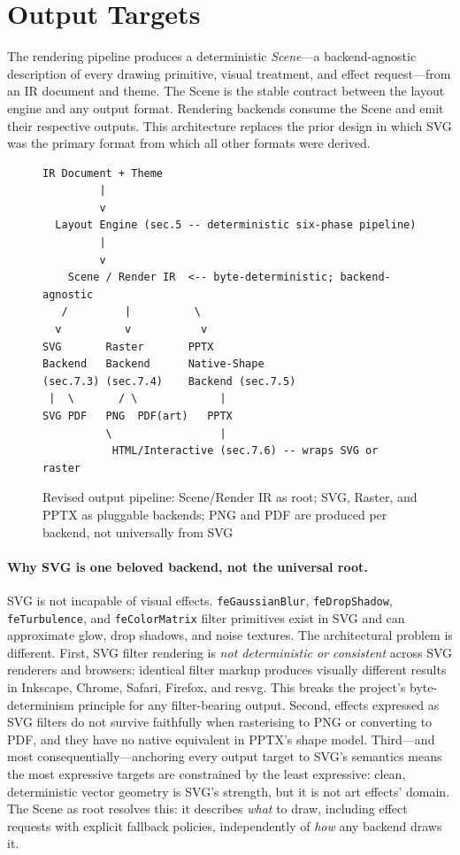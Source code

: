\section{Output Targets}
\label{sec:outputs}

The rendering pipeline produces a deterministic \emph{Scene}---a backend-agnostic
description of every drawing primitive, visual treatment, and effect request---from an IR
document and theme. The Scene is the stable contract between the layout engine and any
output format. Rendering backends consume the Scene and emit their respective outputs.
This architecture replaces the prior design in which SVG was the primary format from
which all other formats were derived.

\begin{figure}[h]
\centering
\begin{Verbatim}[frame=single,fontsize=\small]
  IR Document + Theme
         |
         v
  Layout Engine (sec.5 -- deterministic six-phase pipeline)
         |
         v
    Scene / Render IR  <-- byte-deterministic; backend-agnostic
   /         |          \
  v          v           v
SVG       Raster       PPTX
Backend   Backend      Native-Shape
(sec.7.3) (sec.7.4)    Backend (sec.7.5)
 |  \       / \             |
SVG PDF   PNG  PDF(art)   PPTX
          \                 |
           HTML/Interactive (sec.7.6) -- wraps SVG or raster
\end{Verbatim}
\caption{Revised output pipeline: Scene/Render IR as root; SVG, Raster, and PPTX as
  pluggable backends; PNG and PDF are produced per backend, not universally from SVG}
\label{fig:output-pipeline}
\end{figure}

\paragraph{Why SVG is one beloved backend, not the universal root.}
SVG is not incapable of visual effects. \texttt{feGaussianBlur}, \texttt{feDropShadow},
\texttt{feTurbulence}, and \texttt{feColorMatrix} filter primitives exist in SVG and can
approximate glow, drop shadows, and noise textures. The architectural problem is different.
First, SVG filter rendering is \emph{not deterministic or consistent} across SVG renderers
and browsers: identical filter markup produces visually different results in Inkscape,
Chrome, Safari, Firefox, and resvg. This breaks the project's byte-determinism principle
for any filter-bearing output. Second, effects expressed as SVG filters do not survive
faithfully when rasterising to PNG or converting to PDF, and they have no native equivalent
in PPTX's shape model. Third---and most consequentially---anchoring every output target to
SVG's semantics means the most expressive targets are constrained by the least expressive:
clean, deterministic vector geometry is SVG's strength, but it is not art effects' domain.
The Scene as root resolves this: it describes \emph{what} to draw, including effect
requests with explicit fallback policies, independently of \emph{how} any backend draws it.


